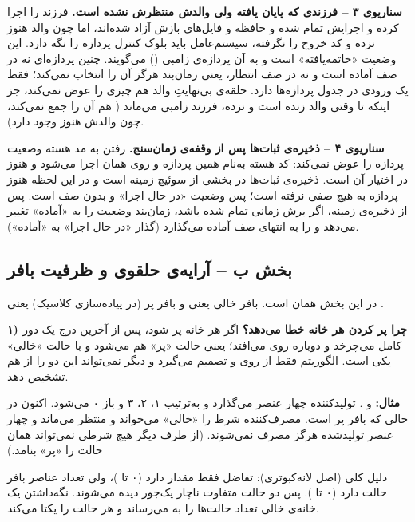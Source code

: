 \textbf{سناریوی ۳ – فرزندی که پایان یافته ولی والدش منتظرش نشده است.} فرزند  را اجرا کرده و اجرایش تمام شده و حافظه و فایل‌های بازش آزاد شده‌اند، اما چون والد هنوز  نزده و کد خروج را نگرفته، سیستم‌عامل باید بلوک کنترل پردازه را نگه دارد. این وضعیت «خاتمه‌یافته» است و به آن پردازه‌ی زامبی () می‌گویند. چنین پردازه‌ای نه در صف آماده است و نه در صف انتظار، یعنی زمان‌بند هرگز آن را انتخاب نمی‌کند؛ فقط یک ورودی در جدول پردازه‌ها دارد. حلقه‌ی بی‌نهایتِ والد هم چیزی را عوض نمی‌کند، جز اینکه تا وقتی والد زنده است و  نزده، فرزند زامبی می‌ماند ( هم آن را جمع نمی‌کند، چون والدش هنوز وجود دارد).

\textbf{سناریوی ۴ – ذخیره‌ی ثبات‌ها پس از وقفه‌ی زمان‌سنج.} رفتن به مد هسته وضعیت پردازه را عوض نمی‌کند: کد هسته به‌نام همین پردازه و روی همان  اجرا می‌شود و  هنوز در اختیار آن است. ذخیره‌ی ثبات‌ها در  بخشی از سوئیچ زمینه است و در این لحظه هنوز پردازه به هیچ صفی نرفته است؛ پس وضعیت «در حال اجرا» و بدون صف است. پس از ذخیره‌ی زمینه، اگر برش زمانی تمام شده باشد، زمان‌بند وضعیت را به «آماده» تغییر می‌دهد و  را به انتهای صف آماده می‌گذارد (گذار «در حال اجرا» به «آماده»).

\subsection*{بخش ب – آرایه‌ی حلقوی و ظرفیت بافر}

در این بخش  همان  است. بافر خالی یعنی  و بافر پر (در پیاده‌سازی کلاسیک) یعنی .

\textbf{۱) چرا پر کردن هر  خانه خطا می‌دهد؟} اگر هر  خانه پر شود، پس از آخرین درج  یک دور کامل می‌چرخد و دوباره روی  می‌افتد؛ یعنی حالت «پر» هم  می‌شود و با حالت «خالی» یکی است. الگوریتم فقط از روی  و  تصمیم می‌گیرد و دیگر نمی‌تواند این دو را از هم تشخیص دهد.

\textbf{مثال:}  و . تولیدکننده چهار عنصر می‌گذارد و  به‌ترتیب ۱، ۲، ۳ و باز ۰ می‌شود. اکنون  در حالی که بافر پر است. مصرف‌کننده شرط  را «خالی» می‌خواند و منتظر می‌ماند و چهار عنصر تولیدشده هرگز مصرف نمی‌شوند. (از طرف دیگر هیچ شرطی نمی‌تواند همان حالت را «پر» بنامد.)

دلیل کلی (اصل لانه‌کبوتری): تفاضل  فقط  مقدار دارد (۰ تا )، ولی تعداد عناصر بافر  حالت دارد (۰ تا ). پس دو حالت متفاوت ناچار یک‌جور دیده می‌شوند. نگه‌داشتن یک خانه‌ی خالی تعداد حالت‌ها را به  می‌رساند و هر حالت را یکتا می‌کند.


